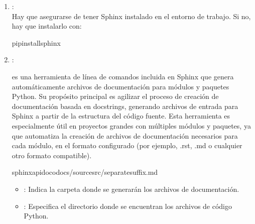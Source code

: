 \documentclass[a4paper,10pt,oneside,spanish,openany]{sphinxmanual}
\begin{document}
\label{\detokenize{configuracion_inicial/007.Creacion_de_ficheros_de_codigo_y_generacion_automatica_de_documentacion:pasos-para-generar-la-documentacion-automaticamente}}\begin{enumerate}
%
\item {} 
\sphinxAtStartPar
{}:\\
Hay que asegurarse de tener Sphinx instalado en el entorno de trabajo. Si no, hay que instalarlo con:

\begin{sphinxVerbatim}[commandchars=\\\{\}]
pipinstallsphinx
\end{sphinxVerbatim}

\item {} 
\sphinxAtStartPar
{}:

\sphinxAtStartPar
{} es una herramienta de línea de comandos incluida en Sphinx que genera automáticamente archivos de documentación para módulos y paquetes Python.
Su propósito principal es agilizar el proceso de creación de documentación basada en docstrings, generando archivos de entrada para Sphinx a partir de la estructura del código fuente.
Esta herramienta es especialmente útil en proyectos grandes con múltiples módulos y paquetes, ya que automatiza la creación de archivos de documentación necesarios para cada módulo, en el formato configurado (por ejemplo, .rst, .md o cualquier otro formato compatible).

\begin{sphinxVerbatim}[commandchars=\\\{\}]
sphinx\PYGZhy{}apidoc\PYGZhy{}odocs/sourcesrc/\PYGZhy{}\PYGZhy{}separate\PYGZhy{}\PYGZhy{}suffix.md
\end{sphinxVerbatim}
\begin{itemize}
\item {} 
\sphinxAtStartPar
{}: Indica la carpeta donde se generarán los archivos de documentación.

\item {} 
\sphinxAtStartPar
{}: Especifica el directorio donde se encuentran los archivos de código Python.


\end{itemize}
\end{enumerate}
\end{document}
